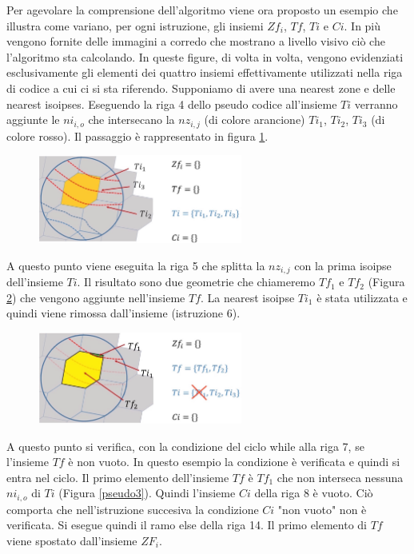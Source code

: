 Per agevolare la comprensione dell'algoritmo viene ora proposto un esempio che illustra come variano, per ogni istruzione, gli insiemi $Zf_i$, $Tf$, $Ti$ e $Ci$. In più vengono fornite delle immagini a corredo che mostrano a livello visivo ciò che l'algoritmo sta calcolando. In queste figure, di volta in volta, vengono evidenziati esclusivamente gli elementi dei quattro insiemi effettivamente utilizzati nella riga di codice a cui ci si sta riferendo. Supponiamo di avere una nearest zone e delle nearest isoipses. Eseguendo la riga 4 dello pseudo codice  all'insieme $Ti$ verranno aggiunte le $ni_{i,o}$ che intersecano la $nz_{i,j}$ (di colore arancione) $Ti_1$, $Ti_2$, $Ti_3$ (di colore rosso). Il passaggio è rappresentato in figura \ref{pseudo1}. 

\begin{figure}[h]
	\centering
	\includegraphics[width=0.6\textwidth]{images/pseudo1}
	\caption{}
	\label{pseudo1}
\end{figure}

A questo punto viene eseguita la riga 5 che splitta la $nz_{i,j}$ con la prima isoipse dell'insieme $Ti$. Il risultato sono due geometrie che chiameremo $Tf_1$ e $Tf_2$ (Figura \ref{pseudo2}) che vengono aggiunte nell'insieme $Tf$. La nearest isoipse $Ti_1$ è stata utilizzata e quindi viene rimossa dall'insieme (istruzione 6).
	
\begin{figure}[h]
	\centering
	\includegraphics[width=0.6\textwidth]{images/pseudo2}
	\caption{}
	\label{pseudo2}
\end{figure}

A questo punto si verifica, con la condizione del ciclo while alla riga 7, se l'insieme $Tf$ è non vuoto. In questo esempio la condizione è verificata e quindi si entra nel ciclo. Il primo elemento dell'insieme $Tf$ è $Tf_1$ che non interseca nessuna $ni_{i,o}$ di $Ti$ (Figura \ref{pseudo3}). Quindi l'insieme $Ci$ della riga 8 è vuoto. Ciò comporta che nell'istruzione succesiva la condizione $Ci$ "non vuoto" non è verificata. Si esegue quindi il ramo else della riga 14. Il primo elemento di $Tf$ viene spostato dall'insieme $ZF_i$.

